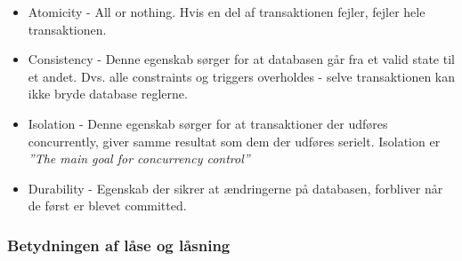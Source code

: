 \begin{itemize}
	\item Atomicity - All or nothing. Hvis en del af transaktionen fejler, fejler hele transaktionen.
	\item Consistency - Denne egenskab sørger for at databasen går fra et valid state til et andet. Dvs. alle constraints og triggers overholdes - selve transaktionen kan ikke bryde database reglerne.
	\item Isolation - Denne egenskab sørger for at transaktioner der udføres concurrently, giver samme resultat som dem der udføres serielt. Isolation er \textit{''The main goal for concurrency control''}
	\item Durability - Egenskab der sikrer at ændringerne på databasen, forbliver når de først er blevet committed.
\end{itemize}
\subsubsection{Betydningen af låse og låsning}

